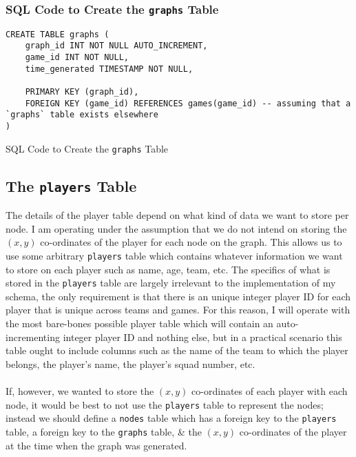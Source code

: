 \documentclass[a4paper,11pt]{article}
\newenvironment{code}{\captionsetup{type=listing}}{}
\begin{document}
\subsubsection{SQL Code to Create the \texttt{graphs} Table}
\begin{code}
\begin{verbatim}
CREATE TABLE graphs (
    graph_id INT NOT NULL AUTO_INCREMENT,
    game_id INT NOT NULL,
    time_generated TIMESTAMP NOT NULL,

    PRIMARY KEY (graph_id),
    FOREIGN KEY (game_id) REFERENCES games(game_id) -- assuming that a `graphs` table exists elsewhere 
)
\end{verbatim}
\caption{SQL Code to Create the \texttt{graphs} Table}
\end{code}

\subsection{The \texttt{players} Table}
The details of the player table depend on what kind of data we want to store per node. 
I am operating under the assumption that we do not intend on storing the $(x,y)$ co-ordinates of the player for each node on the graph. 
This allows us to use some arbitrary \texttt{players} table which contains whatever information we want to store on each player such as name, age, team, etc.
The specifics of what is stored in the \texttt{players} table are largely irrelevant to the implementation of my schema, the only requirement is that there is an unique integer player ID for 
each player that is unique across teams and games.
For this reason, I will operate with the most bare-bones possible player table which will contain an auto-incrementing integer player ID and nothing else, but in a practical scenario this table ought to 
include columns such as the name of the team to which the player belongs, the player's name, the player's squad number, etc.
\\\\
If, however, we wanted to store the $(x,y)$ co-ordinates of each player with each node, it would be best to not use the \texttt{players} table to represent the nodes; instead we should define a 
\texttt{nodes} table which has a foreign key to the \texttt{players} table, a foreign key to the \texttt{graphs} table, \& the $(x,y)$ co-ordinates of the player at the time 
when the graph was generated.
\end{document}
